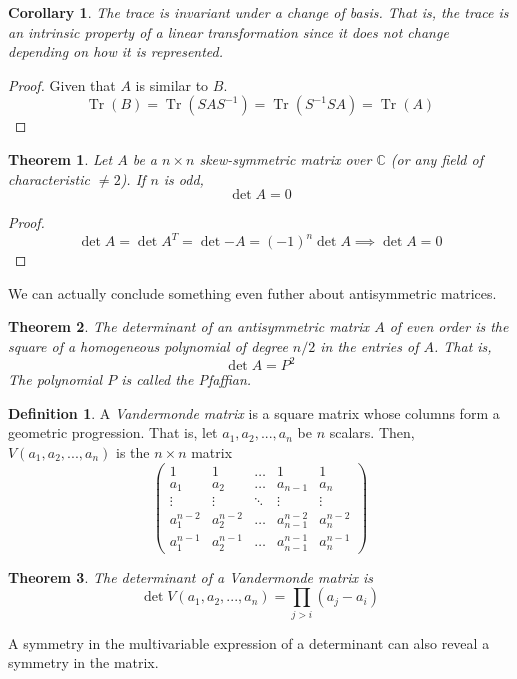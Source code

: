\documentclass{article}
\DeclareMathOperator{\Tr}{Tr}
\newtheorem{theorem}{Theorem}[section]
\newtheorem{corollary}{Corollary}[theorem]
\theoremstyle{remark}
\theoremstyle{definition}
\newtheorem{definition}{Definition}[section]
\begin{document}
\begin{corollary}
The trace is invariant under a change of basis. That is, the trace is an intrinsic property of a linear transformation since it does not change depending on how it is represented. 
\end{corollary}
\begin{proof}
Given that $A$ is similar to $B$. 
\[\Tr(B) = \Tr(S A S^{-1}) = \Tr(S^{-1} S A) = \Tr(A) \]
\end{proof}

\begin{theorem}
Let $A$ be a $n \times n$ skew-symmetric matrix over $\mathbb{C}$ (or any field of characteristic $\neq 2$). If $n$ is odd, 
\[\det{A} = 0 \]
\end{theorem}
\begin{proof}
\[\det{A} = \det{A^T} = \det{-A} = (-1)^n \det{A} \implies \det{A} = 0 \]
\end{proof}

We can actually conclude something even futher about antisymmetric matrices. 

\begin{theorem}
The determinant of an antisymmetric matrix $A$ of even order is the square of a homogeneous polynomial of degree $n/2$ in the entries of $A$. That is, 
\[\det{A} = P^2\]
The polynomial $P$ is called the \textit{Pfaffian}. 
\end{theorem}

\begin{definition}
A \textit{Vandermonde matrix} is a square matrix whose columns form a geometric progression. That is, let $a_1, a_2, ..., a_n$ be $n$ scalars. Then, $V(a_1, a_2, ..., a_n)$ is the $n \times n$ matrix
\[\begin{pmatrix}
1&1&\ldots&1&1 \\
a_1&a_2&\ldots&a_{n-1}&a_n\\
\vdots&\vdots&\ddots&\vdots&\vdots\\
a_1^{n-2}&a_2^{n-2}&\ldots&a_{n-1}^{n-2}&a_n^{n-2}\\
a_1^{n-1}&a_2^{n-1}&\ldots&a_{n-1}^{n-1}&a_n^{n-1}
\end{pmatrix}\]
\end{definition}

\begin{theorem}
The determinant of a Vandermonde matrix is
\[\det{V(a_1, a_2, ..., a_n)} = \prod_{j>i} (a_j - a_i)\]
\end{theorem}

A symmetry in the multivariable expression of a determinant can also reveal a symmetry in the matrix.
\end{document}
